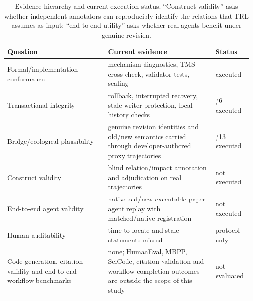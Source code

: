 \documentclass[journal]{IEEEtran}
\begin{document}
\begin{table}[t]
\centering
\caption{Evidence hierarchy and current execution status. ``Construct validity'' asks whether independent annotators can reproducibly identify the relations that TRL assumes as input; ``end-to-end utility'' asks whether real agents benefit under genuine revision.}
\label{tab:hierarchy}
\scriptsize
\begin{tabularx}{\columnwidth}{>{\raggedright\arraybackslash}p{2.15cm}>{\raggedright\arraybackslash}X>{\raggedright\arraybackslash}p{1.25cm}}
\toprule
Question & Current evidence & Status \\
\midrule
Formal/implementation conformance & mechanism diagnostics, TMS cross-check, validator tests, scaling & executed \\
Transactional integrity & rollback, interrupted recovery, stale-writer protection, local history checks & 6/6 executed \\
Bridge/ecological plausibility & 13 genuine revision identities and old/new semantics carried through developer-authored proxy trajectories & 13/13 executed \\
Construct validity & blind relation/impact annotation and adjudication on real trajectories & not executed \\
End-to-end agent validity & native old/new executable-paper-agent replay with matched/native registration & not executed \\
Human auditability & time-to-locate and stale statements missed & protocol only \\
Code-generation, citation-validity and end-to-end workflow benchmarks & none; HumanEval, MBPP, SciCode, citation-validation and workflow-completion outcomes are outside the scope of this study & not evaluated \\
\bottomrule
\end{tabularx}
\end{table}
\end{document}

